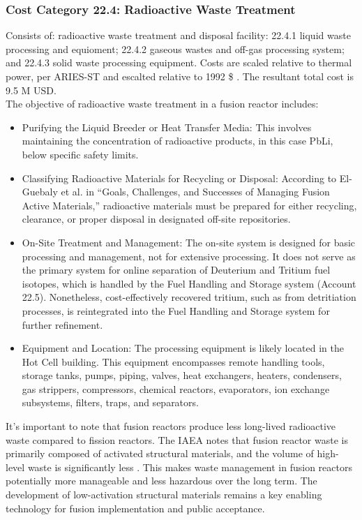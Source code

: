 
\subsubsection{Cost Category 22.4: Radioactive Waste Treatment} 
Consists of: radioactive waste treatment and disposal facility: 22.4.1 liquid waste processing and equioment; 22.4.2 gaseous wastes and off-gas processing system; and 22.4.3 solid waste processing equipment. Costs are scaled relative to thermal power, per ARIES-ST and escalted relative to 1992 \$ \cite{DEL90b}. The resultant total cost is 9.5 M USD. \\

The objective of radioactive waste treatment in a fusion reactor includes:
\begin{itemize}
\item Purifying the Liquid Breeder or Heat Transfer Media: This involves maintaining the concentration of radioactive products, in this case PbLi, below specific safety limits.

\item Classifying Radioactive Materials for Recycling or Disposal: According to El-Guebaly et al. in “Goals, Challenges, and Successes of Managing Fusion Active Materials,” radioactive materials must be prepared for either recycling, clearance, or proper disposal in designated off-site repositories.

\item On-Site Treatment and Management: The on-site system is designed for basic processing and management, not for extensive processing. It does not serve as the primary system for online separation of Deuterium and Tritium fuel isotopes, which is handled by the Fuel Handling and Storage system (Account 22.5). Nonetheless, cost-effectively recovered tritium, such as from detritiation processes, is reintegrated into the Fuel Handling and Storage system for further refinement.

\item Equipment and Location: The processing equipment is likely located in the Hot Cell building. This equipment encompasses remote handling tools, storage tanks, pumps, piping, valves, heat exchangers, heaters, condensers, gas strippers, compressors, chemical reactors, evaporators, ion exchange subsystems, filters, traps, and separators.

\end{itemize}

It's important to note that fusion reactors produce less long-lived radioactive waste compared to fission reactors. The IAEA notes that fusion reactor waste is primarily composed of activated structural materials, and the volume of high-level waste is significantly less \cite{girard2008summary}. This makes waste management in fusion reactors potentially more manageable and less hazardous over the long term. The development of low-activation structural materials remains a key enabling technology for fusion implementation and public acceptance.



